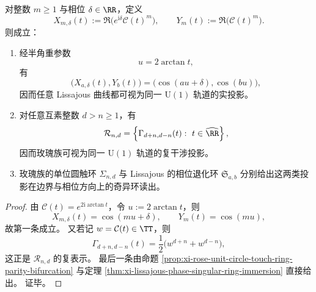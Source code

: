 \begin{corollary}\label{cor:xi-cayley-u1-interference-projection-unification}
对整数 \(m\ge 1\) 与相位 \(\delta\in\RR\)，定义
\[
X_{m,\delta}(t):=\Re\!\bigl(e^{\mathrm{i}\delta}\mathcal C(t)^m\bigr),
\qquad
Y_m(t):=\Re\!\bigl(\mathcal C(t)^m\bigr).
\]
则成立：
\begin{enumerate}
  \item 经半角重参数
  \[
  u=2\arctan t,
  \]
  有
  \[
  \bigl(X_{a,\delta}(t),Y_b(t)\bigr)
  =
  \bigl(\cos(au+\delta),\cos(bu)\bigr),
  \]
  因而任意 Lissajous 曲线都可视为同一 \(\mathrm{U}(1)\) 轨道的实投影。
  \item 对任意互素整数 \(d>n\ge 1\)，有
  \[
  \mathcal R_{n,d}
  =
  \left\{
  \Gamma_{d+n,d-n}(t):\ t\in\widehat{\RR}
  \right\},
  \]
  因而玫瑰族可视为同一 \(\mathrm{U}(1)\) 轨道的复干涉投影。
  \item 玫瑰族的单位圆触环 \(\Sigma_{n,d}\) 与 Lissajous 的相位退化环 \(\mathfrak S_{a,b}\) 分别给出这两类投影在边界与相位方向上的奇异环读出。
\end{enumerate}
\end{corollary}
\begin{proof}
由 \(\mathcal C(t)=e^{2\mathrm{i}\arctan t}\)，令 \(u:=2\arctan t\)，则
\[
X_{m,\delta}(t)=\cos(mu+\delta),
\qquad
Y_m(t)=\cos(mu),
\]
故第一条成立。
又若记 \(w=\mathcal C(t)\in\TT\)，则
\[
\Gamma_{d+n,d-n}(t)
=
\frac12\bigl(w^{d+n}+w^{d-n}\bigr),
\]
这正是 \(\mathcal R_{n,d}\) 的复表示。
最后一条由命题 \ref{prop:xi-rose-unit-circle-touch-ring-parity-bifurcation} 与定理 \ref{thm:xi-lissajous-phase-singular-ring-immersion} 直接给出。
证毕。
\end{proof}

